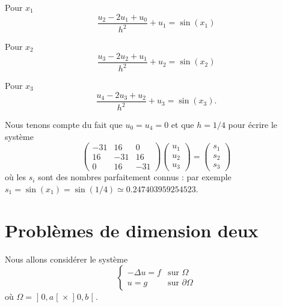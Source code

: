 \begin{subproof}
	\item[Pour \( x_1\)]
	\begin{equation}
		\frac{ u_2-2u_1+u_0 }{ h^2 }+u_1=\sin(x_1)
	\end{equation}
	\item[Pour \( x_2\)]
	\begin{equation}
		\frac{ u_3-2u_2+u_1 }{ h^2 }+u_2=\sin(x_2)
	\end{equation}
	\item[Pour \( x_3\)]
	\begin{equation}
		\frac{ u_4-2u_3+u_2 }{ h^2 }+u_3=\sin(x_3).
	\end{equation}
\end{subproof}
Nous tenons compte du fait que \( u_0=u_4=0\) et que \( h=1/4\) pour écrire le système
\begin{equation}
	\begin{pmatrix}
		-31 & 16  & 0   \\
		16  & -31 & 16  \\
		0   & 16  & -31
	\end{pmatrix}\begin{pmatrix}
		u_1 \\
		u_2 \\
		u_3
	\end{pmatrix}=\begin{pmatrix}
		s_1 \\
		s_2 \\
		s_3
	\end{pmatrix}
\end{equation}
où les \( s_i\) sont des nombres parfaitement connus : par exemple \( s_1=\sin(x_1)=\sin(1/4)\simeq 0.247403959254523\).

\section{Problèmes de dimension deux}

Nous allons considérer le système
\begin{equation}                \label{SYSooTANLooRgnIMp}
	\begin{cases}
		-\Delta u=f & \text{sur } \Omega         \\
		u=g         & \text{sur } \partial\Omega
	\end{cases}
\end{equation}
où \( \Omega=\mathopen] 0 , a \mathclose[\times \mathopen] 0 , b \mathclose[\).

